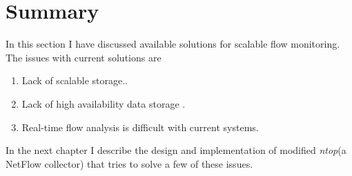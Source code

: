       \section{Summary}
      In this section I have discussed  available solutions for scalable flow monitoring. The issues with current solutions are 
      \begin{enumerate}
       \item Lack of scalable storage.\cite{emc2}\cite{nfdump}.
       \item Lack of high availability data storage \cite{Lee}.
       \item Real-time flow analysis is difficult with current systems. \cite{Lee}  
      \end{enumerate}

      In the next chapter I describe the design and implementation of modified \emph{ntop}(a NetFlow collector) that tries to solve a few of these issues.
      
